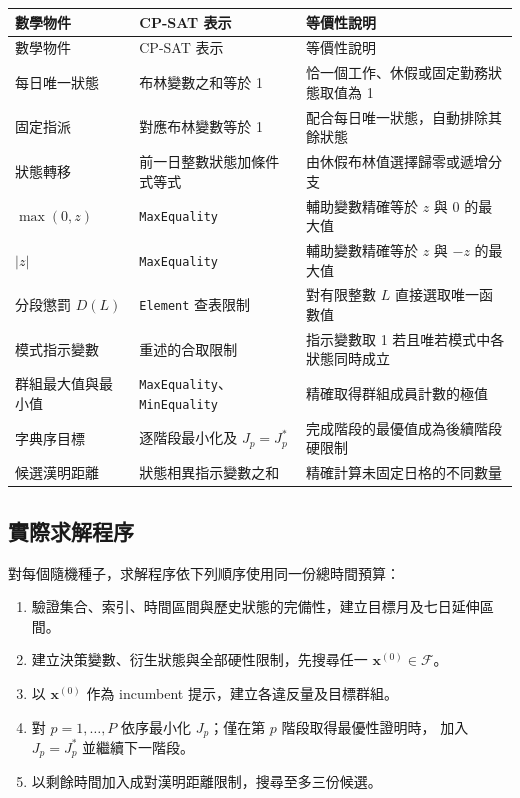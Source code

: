 \documentclass[a4paper,12pt]{article}
\begin{document}
\footnotesize
\setlength{\tabcolsep}{3pt}
\begin{longtable}{p{3.6cm}p{5.0cm}p{5.8cm}}
  \toprule
  數學物件 & CP-SAT 表示 & 等價性說明 \\
  \midrule
  \endfirsthead
  \toprule
  數學物件 & CP-SAT 表示 & 等價性說明 \\
  \midrule
  \endhead
  每日唯一狀態 & 布林變數之和等於 1 & 恰一個工作、休假或固定勤務狀態取值為 1 \\
  固定指派 & 對應布林變數等於 1 & 配合每日唯一狀態，自動排除其餘狀態 \\
  狀態轉移 & 前一日整數狀態加條件式等式 & 由休假布林值選擇歸零或遞增分支 \\
  \(\max(0,z)\) & \texttt{MaxEquality} & 輔助變數精確等於 \(z\) 與 0 的最大值 \\
  \(|z|\) & \texttt{MaxEquality} & 輔助變數精確等於 \(z\) 與 \(-z\) 的最大值 \\
  分段懲罰 \(D(L)\) & \texttt{Element} 查表限制 & 對有限整數 \(L\) 直接選取唯一函數值 \\
  模式指示變數 & 重述的合取限制 & 指示變數取 1 若且唯若模式中各狀態同時成立 \\
  群組最大值與最小值 & \texttt{MaxEquality}、\texttt{MinEquality} & 精確取得群組成員計數的極值 \\
  字典序目標 & 逐階段最小化及 \(J_p=J_p^*\) & 完成階段的最優值成為後續階段硬限制 \\
  候選漢明距離 & 狀態相異指示變數之和 & 精確計算未固定日格的不同數量 \\
  \bottomrule
\end{longtable}
\normalsize
\setlength{\tabcolsep}{6pt}

\subsection{實際求解程序}

對每個隨機種子，求解程序依下列順序使用同一份總時間預算：
\begin{enumerate}
  \item 驗證集合、索引、時間區間與歷史狀態的完備性，建立目標月及七日延伸區間。
  \item 建立決策變數、衍生狀態與全部硬性限制，先搜尋任一 \(\mathbf x^{(0)}\in\mathcal F\)。
  \item 以 \(\mathbf x^{(0)}\) 作為 incumbent 提示，建立各違反量及目標群組。
  \item 對 \(p=1,\ldots,P\) 依序最小化 \(J_p\)；僅在第 \(p\) 階段取得最優性證明時，
    加入 \(J_p=J_p^*\) 並繼續下一階段。
  \item 以剩餘時間加入成對漢明距離限制，搜尋至多三份候選。
\end{enumerate}
\end{document}

